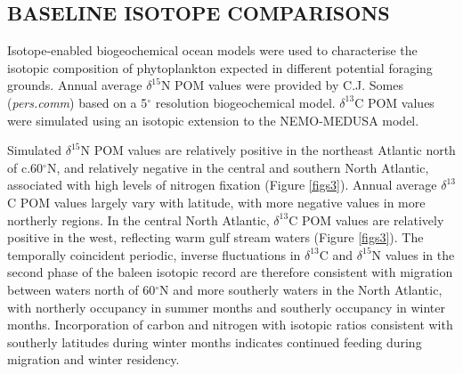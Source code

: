 \documentclass[a4paper,10pt]{article}
\begin{document}
\subsection*{BASELINE ISOTOPE COMPARISONS}
Isotope-enabled biogeochemical ocean models\cite{magozzi2017using,schmittner2016complementary} were used to characterise the isotopic composition of phytoplankton expected in different potential foraging grounds. 
Annual average $\delta^{15}$N POM values were provided by C.J. Somes (\textit{pers.comm}) based on a 5$^{\circ}$ resolution biogeochemical model. 
$\delta^{13}$C POM values were simulated using an isotopic extension to the NEMO-MEDUSA model\cite{magozzi2017using}.
 
Simulated $\delta^{15}$N POM values are relatively positive in the northeast Atlantic north of c.60$^{\circ}$N, and relatively negative in the central and southern North Atlantic, associated with high levels of nitrogen fixation (Figure \ref{figs3}). 
Annual average $\delta^{13}$C POM values largely vary with latitude, with more negative values in more northerly regions. 
In the central North Atlantic, $\delta^{13}$C POM values are relatively positive in the west, reflecting warm gulf stream waters (Figure \ref{figs3}). 
The temporally coincident periodic, inverse fluctuations in $\delta^{13}$C and $\delta^{15}$N values in the second phase of the baleen isotopic record are therefore consistent with migration between waters north of 60$^{\circ}$N and more southerly waters in the North Atlantic, with northerly occupancy in summer months and southerly occupancy in winter months. 
Incorporation of carbon and nitrogen with isotopic ratios consistent with southerly latitudes during winter months indicates continued feeding during migration and winter residency.
 
\end{document}
